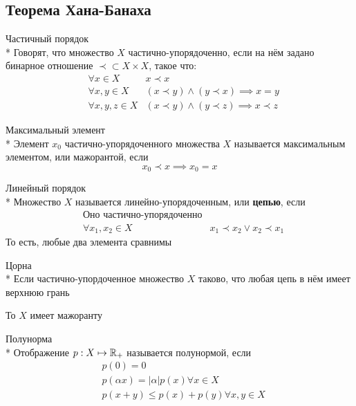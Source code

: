 \subsection{Теорема Хана-Банаха}

\begin{dfn}{Частичный порядок}\\*
  Говорят, что множество $X$
  частично-упорядоченно,
  если на нём задано бинарное отношение
  $\prec\subset X\times X$, такое что:
  \begin{align*}
    & \forall x\in X & x\prec x \\
    & \forall x,y\in X & (x\prec y)\land (y\prec x) \implies x=y\\
    & \forall x,y,z\in X & (x\prec y)\land (y\prec z) \implies x\prec z
  \end{align*}
\end{dfn}

\begin{dfn}{Максимальный элемент}\\*
  Элемент $x_0$ частично-упорядоченного множества $X$
  называется максимальным элементом, или мажорантой, если
  $$x_0\prec x \implies x_0=x$$
\end{dfn}

\begin{dfn}{Линейный порядок}\\*
  Множество $X$ называется линейно-упорядоченным,
  или \textbf{цепью}, если
  \begin{align*}
    & \text{Оно частично-упорядоченно} \\
    & \forall x_1,x_2\in X & x_1\prec x_2 \lor x_2\prec x_1
  \end{align*}
  То есть, любые два элемента сравнимы
\end{dfn}

\begin{lemma}{Цорна}\\*
  Если частично-упордоченное множество $X$
  таково, что любая цепь в нём имеет верхнюю грань

  То $X$ имеет мажоранту
\end{lemma}

\begin{dfn}{Полунорма}\\*
  Отображение $p : X\mapsto\mathbb{R}_+$ называется полунормой, если
  \begin{align*}
    & p(0) = 0 \\
    & p(\alpha x) = \left|\alpha\right| p(x) \forall x\in X\\
    & p(x+y) \leq p(x) + p(y) \forall x,y\in X
  \end{align*}
\end{dfn}

